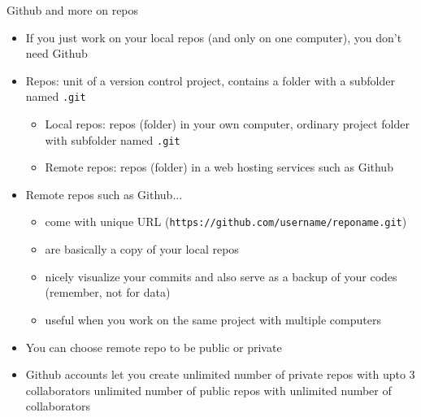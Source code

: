 \documentclass[handout,pdftex,10pt,aspectratio=169]{beamer}
\begin{document}
\begin{frame}{Github and more on repos}
  \begin{itemize}[<+->]%
    \item If you just work on your local repos (and only on one computer), you don't need Github
    \item Repos: unit of a version control project, 
    contains a folder with a subfolder named \texttt{.git}
    \begin{itemize}
      \item Local repos: repos (folder) in your own computer, ordinary project folder with subfolder named \texttt{.git}
      \item Remote repos: repos (folder) in a web hosting services such as Github
    \end{itemize}
    \item Remote repos such as Github...
    \begin{itemize}
      \item come with unique URL (\texttt{https://github.com/username/reponame.git})
      \item are basically a copy of your local repos
      \item nicely visualize your commits 
      and also serve as a backup of your codes (remember, not for data)
      \item useful when you work on the same project with multiple computers
    \end{itemize}
    \item You can choose remote repo to be public or private
    \item Github accounts let you create unlimited number of private repos
    with upto 3 collaborators unlimited number of public repos with unlimited number of collaborators
  \end{itemize}
\end{frame}
\end{document}
